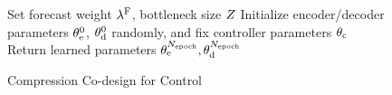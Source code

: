 \begin{wrapfigure}{L}{0.5\textwidth}
\begin{minipage}{0.5\textwidth}
\begin{algorithm}[H]
   \caption{Compression Co-design for Control}
   \label{alg:codesign}
   \begin{algorithmic}[1]
       \STATE Set forecast weight $\lambda^{\mathrm{F}}$, bottleneck size $Z$ \label{alg:lambda}
       \STATE Initialize encoder/decoder parameters $\theta_{\mathrm{e}}^{0}$, $\theta_{\mathrm{d}}^{0}$ randomly, and fix controller parameters $\theta_{\mathrm{c}}$ \label{alg:init_controller}
       \ENDFOR
       \STATE Return learned parameters $\theta_{\mathrm{e}}^{N_{\text{epoch}}}, \theta_{\mathrm{d}}^{N_{\text{epoch}}}$
    \end{algorithmic}
\end{algorithm}

\end{minipage}
\end{wrapfigure}
